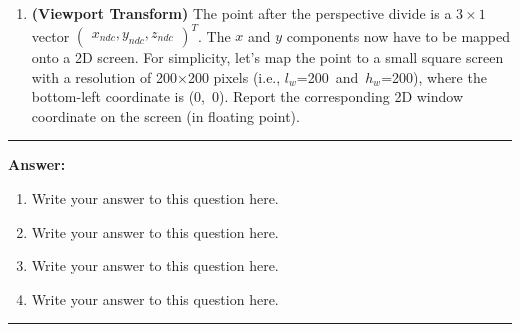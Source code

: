 \documentclass[conference]{styles/acmsiggraph}
\renewcommand{\vec}[1]{\mathbf{#1}}
\newenvironment{answer}{}{}
\newcommand{\pointsin}[1]{\normalfont{(\textit{#1pts})}}
\begin{document}
\begin{enumerate}[label=(\roman*)]
	Report the projection matrix, the transformed point in clip coordinates, $\vec{p}_{clip}$ ($4\times1$ vector), and the transformed point in normalized device coordinates, $\vec{p}_{ndc}$ ($3\times1$ vector), after the perspective divide. \pointsin{5}
	
	\item \textbf{(Viewport Transform)} The point after the perspective divide is a $3\times1$ vector $\begin{pmatrix} x_{ndc},y_{ndc},z_{ndc} \end{pmatrix}^{ T }$. The $x$ and $y$ components now have to be mapped onto a 2D screen. For simplicity, let's map the point to a small square screen with a resolution of 200$\times$200 pixels (i.e., $l_{ w }$=200\, and\, $h_{ w }$=200), where the bottom-left coordinate is (0,\ 0). Report the corresponding 2D window coordinate on the screen (in floating point). \pointsin{5}
\end{enumerate}


\begin{answer}
	\rule{\textwidth}{0.4pt}
	\textbf{Answer:}
	\begin{enumerate}[label=(\roman*)]
		\item Write your answer to this question here.
		\item Write your answer to this question here.
		\item Write your answer to this question here.
		\item Write your answer to this question here.
	\end{enumerate}
	\rule{\textwidth}{0.4pt}
\end{answer}
\end{document}
